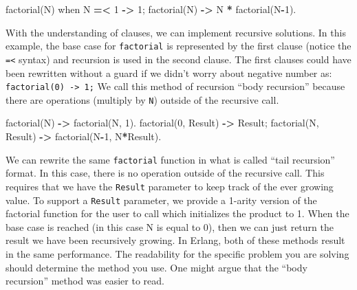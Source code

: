 \documentclass[
]{book}
\newenvironment{Shaded}{\begin{snugshade}}{\end{snugshade}}
\newcommand{\CharTok}[1]{\textcolor[rgb]{0.31,0.60,0.02}{#1}}
\newcommand{\DecValTok}[1]{\textcolor[rgb]{0.00,0.00,0.81}{#1}}
\newcommand{\FunctionTok}[1]{\textcolor[rgb]{0.00,0.00,0.00}{#1}}
\newcommand{\OperatorTok}[1]{\textcolor[rgb]{0.81,0.36,0.00}{\textbf{#1}}}
\newcommand{\VariableTok}[1]{\textcolor[rgb]{0.00,0.00,0.00}{#1}}
\begin{document}
\begin{Shaded}
\begin{Highlighting}[]
\FunctionTok{factorial(}\VariableTok{N}\FunctionTok{)} \CharTok{when} \VariableTok{N} \OperatorTok{=\textless{}} \DecValTok{1} \OperatorTok{{-}\textgreater{}} \DecValTok{1}\FunctionTok{;}
\FunctionTok{factorial(}\VariableTok{N}\FunctionTok{)} \OperatorTok{{-}\textgreater{}} \VariableTok{N} \OperatorTok{*} \FunctionTok{factorial(}\VariableTok{N}\OperatorTok{{-}}\DecValTok{1}\FunctionTok{).}
\end{Highlighting}
\end{Shaded}

With the understanding of clauses, we can implement recursive solutions. In this example, the base case for \texttt{factorial} is represented by the first clause (notice the \texttt{=\textless{}} syntax) and recursion is used in the second clause. The first clauses could have been rewritten without a guard if we didn't worry about negative number as: \texttt{factorial(0)\ -\textgreater{}\ 1;} We call this method of recursion ``body recursion'' because there are operations (multiply by \texttt{N}) outside of the recursive call.

\begin{Shaded}
\begin{Highlighting}[]
\FunctionTok{factorial(}\VariableTok{N}\FunctionTok{)} \OperatorTok{{-}\textgreater{}} \FunctionTok{factorial(}\VariableTok{N}\FunctionTok{,} \DecValTok{1}\FunctionTok{).}
\FunctionTok{factorial(}\DecValTok{0}\FunctionTok{,} \VariableTok{Result}\FunctionTok{)} \OperatorTok{{-}\textgreater{}} \VariableTok{Result}\FunctionTok{;}
\FunctionTok{factorial(}\VariableTok{N}\FunctionTok{,} \VariableTok{Result}\FunctionTok{)} \OperatorTok{{-}\textgreater{}} \FunctionTok{factorial(}\VariableTok{N}\OperatorTok{{-}}\DecValTok{1}\FunctionTok{,} \VariableTok{N}\OperatorTok{*}\VariableTok{Result}\FunctionTok{).}
\end{Highlighting}
\end{Shaded}

We can rewrite the same \texttt{factorial} function in what is called ``tail recursion'' format. In this case, there is no operation outside of the recursive call. This requires that we have the \texttt{Result} parameter to keep track of the ever growing value. To support a \texttt{Result} parameter, we provide a 1-arity version of the factorial function for the user to call which initializes the product to 1. When the base case is reached (in this case N is equal to 0), then we can just return the result we have been recursively growing. In Erlang, both of these methods result in the same performance. The readability for the specific problem you are solving should determine the method you use. One might argue that the ``body recursion'' method was easier to read.
\end{document}
